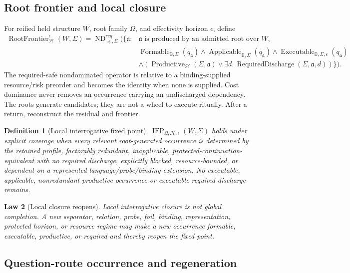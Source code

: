 \documentclass[11pt,oneside]{article}
\newtheorem{definition}{Definition}[section]
\newtheorem{law}[definition]{Law}
\newcommand{\B}{\mathbb B}
\newcommand{\Applicable}{\operatorname{Applicable}}
\newcommand{\Formable}{\operatorname{Formable}}
\newcommand{\Executable}{\operatorname{Executable}}
\newcommand{\Productive}{\operatorname{Productive}}
\newcommand{\RequiredDischarge}{\operatorname{RequiredDischarge}}
\newcommand{\RootFrontier}{\operatorname{RootFrontier}}
\newcommand{\IFP}{\operatorname{IFP}}
\newcommand{\AskRef}{\mathfrak a}
\newcommand{\ND}{\operatorname{ND}}
\begin{document}
\subsection{Root frontier and local closure}

For reified held structure \(W\), root family \(\Omega\), and effectivity horizon \(\epsilon\),
define
\[
\boxed{
\begin{aligned}
\RootFrontier^{\epsilon}_{\mathcal H}(W,\Sigma)
=\ND^{req}_{\preceq,\Sigma}\!\bigl(\{\AskRef:{}&
              \AskRef\text{ is produced by an admitted root over }W,\\
              &\Formable_{\B,\Sigma}(q_{\AskRef})
               \land\Applicable_{\B,\Sigma}(q_{\AskRef})
               \land\Executable_{\B,\Sigma,\epsilon}(q_{\AskRef})\\
              &\land(\Productive_{\mathcal H}(\Sigma,\AskRef)
               \lor\exists d.\,\RequiredDischarge(\Sigma,\AskRef,d))
               \}\bigr).
\end{aligned}
}
\]
The required-safe nondominated operator is relative to a binding-supplied resource/risk preorder and
becomes the identity when none is supplied.  Cost dominance never removes an occurrence carrying an
undischarged dependency.  The roots generate candidates; they are not a wheel to execute
ritually.  After a return, reconstruct the residual and frontier.

\begin{definition}[Local interrogative fixed point]\label{def:local-ifp}
\(\IFP_{\Omega,\mathcal H,\epsilon}(W,\Sigma)\) holds under explicit coverage when every relevant
root-generated occurrence is determined by the retained profile, factorably redundant,
inapplicable, protected-continuation-equivalent with no required discharge, explicitly blocked,
resource-bounded, or dependent on a represented language/probe/binding extension.  No executable,
applicable, nonredundant productive occurrence or executable required discharge remains.
\end{definition}

\begin{law}[Local closure reopens]\label{law:local-ifp-reopens}
Local interrogative closure is not global completion.  A new separator, relation, probe, foil,
binding, representation, protected horizon, or resource regime may make a new occurrence formable,
executable, productive, or required and thereby reopen the fixed point.
\end{law}

\subsection{Question-route occurrence and regeneration}
\end{document}
